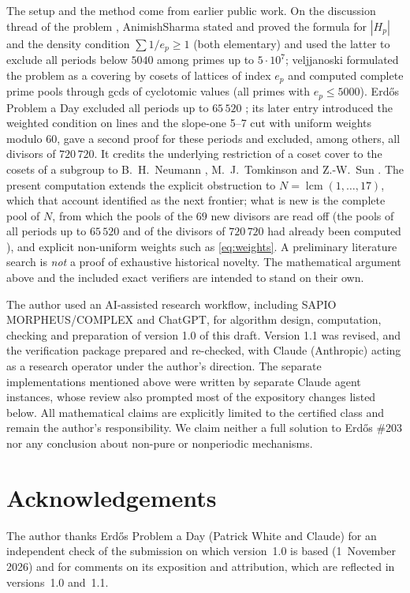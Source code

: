 \documentclass[11pt,a4paper]{article}
\newcommand{\lcm}{\operatorname{lcm}}
\begin{document}
The setup and the method come from earlier public work. On the discussion thread of the problem \cite{Forum203}, AnimishSharma stated and proved the formula for $|H_p|$ and the density condition $\sum1/e_p\ge1$ (both elementary) and used the latter to exclude all periods below $5040$ among primes up to $5\cdot10^7$; veljjanoski formulated the problem as a covering by cosets of lattices of index $e_p$ and computed complete prime pools through gcds of cyclotomic values (all primes with $e_p\le5000$). Erd\H{o}s Problem a Day excluded all periods up to $65\,520$ \cite{ProblemADayOct12}; its later entry \cite{ProblemADayOct14} introduced the weighted condition on lines and the slope-one 5--7 cut with uniform weights modulo $60$, gave a second proof for these periods and excluded, among others, all divisors of $720\,720$. It credits the underlying restriction of a coset cover to the cosets of a subgroup to B.~H.~Neumann \cite{Neumann54}, M.~J.~Tomkinson \cite{Tomkinson87} and Z.-W.~Sun \cite{Sun06}. The present computation extends the explicit obstruction to $N=\lcm(1,\ldots,17)$, which that account identified as the next frontier; what is new is the complete pool of $N$, from which the pools of the $69$ new divisors are read off (the pools of all periods up to $65\,520$ and of the divisors of $720\,720$ had already been computed \cite{Forum203,ProblemADayOct12,ProblemADayOct14}), and explicit non-uniform weights such as \eqref{eq:weights}. A preliminary literature search is \emph{not} a proof of exhaustive historical novelty. The mathematical argument above and the included exact verifiers are intended to stand on their own.

The author used an AI-assisted research workflow, including SAPIO MORPHEUS/COMPLEX and ChatGPT, for algorithm design, computation, checking and preparation of version 1.0 of this draft. Version 1.1 was revised, and the verification package prepared and re-checked, with Claude (Anthropic) acting as a research operator under the author's direction. The separate implementations mentioned above were written by separate Claude agent instances, whose review also prompted most of the expository changes listed below. All mathematical claims are explicitly limited to the certified class and remain the author's responsibility. We claim neither a full solution to Erd\H{o}s \#203 nor any conclusion about non-pure or nonperiodic mechanisms.

\section*{Acknowledgements}
The author thanks Erd\H{o}s Problem a Day (Patrick White and Claude) for an independent check of the submission on which version~1.0 is based (1~November 2026) and for comments on its exposition and attribution, which are reflected in versions~1.0 and~1.1.
\end{document}
